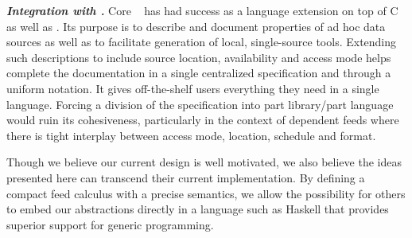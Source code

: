 {\textbf{\textit{Integration with \pads{}.}}  Core
\pads{}~\cite{fisher+:pads,fisher+:popl06,fisher+:dirttoshovels,mandelbaum+:pads-ml} has had success as a language extension on top of C as well as
\ocaml{}.  Its purpose is to describe and document properties of ad hoc
data sources as well as to facilitate generation of local, single-source 
tools.  Extending such descriptions to include source location, 
availability and 
access mode helps complete the documentation in a single centralized 
specification and through a uniform notation.  It gives off-the-shelf
users everything they need in a single language.  Forcing a division 
of the specification into part library/part language would ruin its
cohesiveness, particularly in the context of
dependent feeds where there is tight interplay between access mode, location,
schedule and format.


Though we believe our current design is well motivated,
we also believe the ideas presented here can transcend
their current implementation.  By defining a compact feed calculus 
with a precise semantics, we allow the possibility for
others to embed our abstractions directly in a language
such as Haskell that provides superior support for generic programming. 

}%
